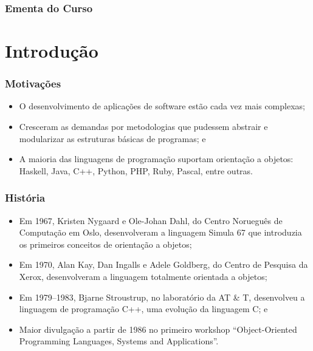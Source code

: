 \documentclass{beamer}
\begin{document}
\begin{frame}
	\frametitle{Ementa do Curso}
  	\tableofcontents
\end{frame}


\section{Introdução}

\begin{frame}
	\frametitle{Motivações}
	
	\begin{itemize}
		\item O desenvolvimento de aplicações de software estão cada vez mais complexas;
        \item Cresceram as demandas por metodologias que pudessem abstrair e modularizar as estruturas básicas de programas; e
        \item A maioria das linguagens de programação suportam orientação a objetos: Haskell, Java, C++, Python, PHP, Ruby, Pascal, entre outras.
	\end{itemize}
\end{frame}

\begin{frame}
	\frametitle{História}
	
	\begin{itemize}
		\item Em 1967, Kristen Nygaard e Ole-Johan Dahl, do Centro Norueguês de Computação em Oslo, desenvolveram a linguagem Simula 67 que introduzia os primeiros conceitos de orientação a objetos;
		\item Em 1970, Alan Kay, Dan Ingalls e Adele Goldberg, do Centro de Pesquisa da Xerox, desenvolveram a linguagem totalmente orientada a objetos;

		\item Em 1979--1983, Bjarne Stroustrup, no laboratório da AT \& T, desenvolveu a linguagem de programação C++, uma evolução da linguagem C; e
		
		\item Maior  divulgação  a  partir  de  1986  no primeiro workshop ``Object-Oriented  Programming  Languages, Systems  and  Applications''.
	\end{itemize}
\end{frame}
\end{document}
